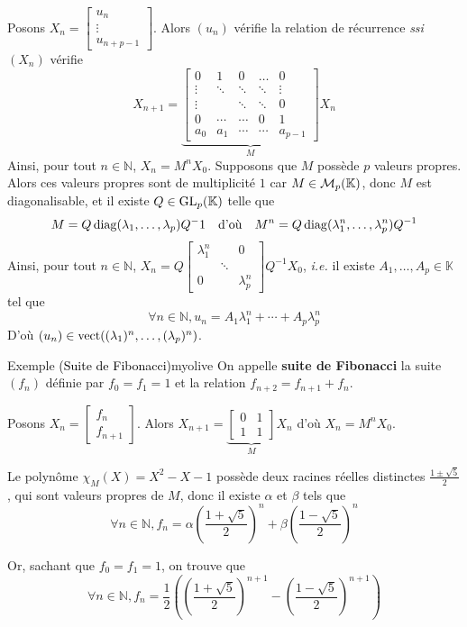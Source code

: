     Posons $X_n = \begin{bmatrix}
        u_n \\
        \vdots \\
        u_{n + p-1}
    \end{bmatrix}$. Alors $(u_n)$ vérifie la relation de récurrence \textit{ssi} $(X_n)$ vérifie 
    \[ X_{n + 1} = \underbrace{\begin{bmatrix}
        0 & 1 & 0 & \ldots & 0 \\
        \vdots & \ddots & \ddots & \ddots & \vdots \\
        \vdots & & \ddots & \ddots & 0 \\
        0 & \cdots & \cdots & 0 &  1 \\
        a_0 & a_1 & \cdots & \cdots & a_{p-1}
    \end{bmatrix}}_{M} X_n \]  
    Ainsi, pour tout  $n \in \mathbb{N}$, $X_n = M^n X_0$. Supposons que $M$ possède $p$ valeurs propres. Alors ces valeurs propres sont de multiplicité $1$ car $M \in \mathcal{M}_{p}(\mathbb{K})$, donc $M$ est diagonalisable, et il existe $Q \in \operatorname{GL}_p(\mathbb{K})$ telle que 
    \[ M = Q \operatorname{diag}(\lambda_1,\ldots,\lambda_p)Q^-1 \quad \text{d’où} \quad M^n = Q \operatorname{diag}(\lambda_1^n, \ldots, \lambda_p^n) Q^{-1} \] 
    Ainsi, pour tout $n \in \mathbb{N}$, $X_n = Q \begin{bmatrix}
        \lambda_1^n & & 0 \\
        & \ddots & \\
        0 & & \lambda_p^n
    \end{bmatrix} Q^{-1} X_0$, \textit{i.e.} il existe $A_1,\ldots,A_p \in \mathbb{K}$ tel que 
    \[ \forall n \in \mathbb{N}, u_n = A_1 \lambda_1^n + \cdots + A_p \lambda_p^n \]   
    D’où $(u_n) \in \operatorname{vect}((\lambda_1)^n, \ldots, (\lambda_p)^n)$.

    \begin{omed}{Exemple \textcolor{black}{(Suite de Fibonacci)}}{myolive}
        On appelle \textbf{suite de Fibonacci} la suite $(f_n)$ définie par $f_0 = f_1 = 1$ et la relation $f_{n+2} = f_{n+1} + f_n$. 

        Posons $X_n = \begin{bmatrix}
            f_n \\
            f_{n+1}
        \end{bmatrix}$. Alors $X_{n+1} = \underbrace{\begin{bmatrix}
            0 & 1 \\
            1 & 1
        \end{bmatrix}}_M X_n$ d’où $X_n = M^n X_0$.

        Le polynôme $\chi_M(X) = X^2 - X - 1$ possède deux racines réelles distinctes $\frac{1 \pm \sqrt{5}}{2}$, qui sont valeurs propres de $M$, donc il existe $\alpha$ et $\beta$ tels que 
        \[ \forall n \in \mathbb{N}, f_n = \alpha \left( \frac{1 + \sqrt{5}}{2} \right)^n + \beta \left( \frac{1-\sqrt{5}}{2} \right)^n \]
        
        Or, sachant que $f_0 = f_1 = 1$, on trouve que 
        \[ \forall n \in \mathbb{N}, f_n = \frac{1}{2} \left( \left( \frac{1 + \sqrt{5}}{2} \right)^{n+1} - \left( \frac{1-\sqrt{5}}{2} \right)^{n+1}  \right) \]
    \end{omed}

